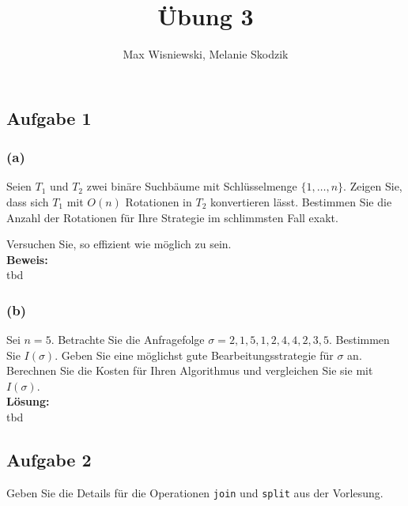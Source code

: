 \documentclass[11pt,a4paper,ngerman]{article}
\date{}
\title{Übung 3}
\author{Max Wisniewski, Melanie Skodzik}
\begin{document}

\renewcommand{\figurename}{Grafik}

\maketitle
\thispagestyle{fancy}


\subsection*{Aufgabe 1}

\subsubsection*{(a)}
Seien $T_1$ und $T_2$ zwei binäre Suchbäume mit Schlüsselmenge $\{1, \ldots, n\}$. Zeigen Sie, dass sich $T_1$ mit $O(n)$ Rotationen in $T_2$ konvertieren lässt. Bestimmen Sie die Anzahl der Rotationen für Ihre Strategie im schlimmsten Fall exakt.

Versuchen Sie, so effizient wie möglich zu sein.\\

\noindent\textbf{Beweis:}\\

tbd

\subsubsection*{(b)}

Sei $n=5$. Betrachte Sie die Anfragefolge $\sigma = 2,1,5,1,2,4,4,2,3,5$. Bestimmen Sie $I(\sigma)$. Geben Sie eine möglichst gute Bearbeitungsstrategie für $\sigma$ an. Berechnen Sie die Kosten für Ihren Algorithmus und vergleichen Sie sie mit $I(\sigma)$.\\

\noindent\textbf{Lösung:}\\

tbd


\subsection*{Aufgabe 2}

Geben Sie die Details für die Operationen \lstinline|join| und \lstinline|split| aus der Vorlesung.
\end{document}
